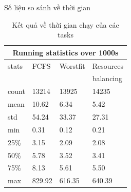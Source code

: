 \documentclass[11pt,xcolor={dvipsnames}, aspectratio=169]{beamer}
\begin{document}
\begin{frame}
{Số liệu so sánh về thời gian}
\begin{table}[h!]
	\centering
	\caption{Kết quả về thời gian chạy của các tasks}
	\begin{tabular}{|p{1.5cm}| p{1.5cm} | p{1.5cm} | p{1.6cm}|}
		\hline
		\multicolumn{4}{|c|}{Running statistics over 1000s} \\
		\hline
		stats & FCFS & Worstfit & Resources \\
			&	&	& balancing \\
		\hline
		\hline
		count&13214&13925&14235 \\
		\hline
		mean&10.62&6.34&5.42 \\
		\hline
		std&54.24&33.37&27.31 \\
		\hline
		min&0.31&0.12&0.21 \\
		\hline
		25\%&3.15&2.09&2.08 \\
		\hline
		50\%&5.78&3.52&3.41 \\
		\hline
		75\%&8.13&5.61&5.50 \\
		\hline
		max&829.92&616.35&640.39 \\
		\hline
	\end{tabular}
	\label{table:finished_tasks}
\end{table}
\end{frame}
\end{document}
